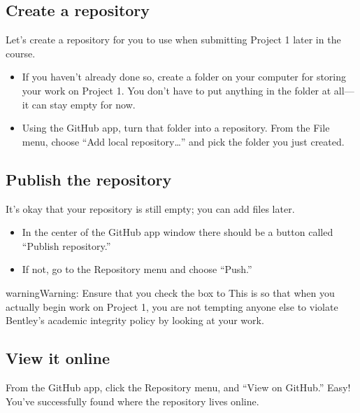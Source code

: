 \documentclass[letterpaper,10pt,english]{jupyterBook}
\begin{document}
\subsection{Create a repository}
\label{\detokenize{chapter-8-version-control:create-a-repository}}
\sphinxAtStartPar
Let’s create a repository for you to use when submitting Project 1 later in the course.
\begin{itemize}
\item {} 
\sphinxAtStartPar
If you haven’t already done so, create a folder on your computer for storing your work on Project 1.  You don’t have to put anything in the folder at all—it can stay empty for now.

\item {} 
\sphinxAtStartPar
Using the GitHub app, turn that folder into a repository.  From the File menu, choose “Add local repository…” and pick the folder you just created.

\end{itemize}


\subsection{Publish the repository}
\label{\detokenize{chapter-8-version-control:publish-the-repository}}
\sphinxAtStartPar
It’s okay that your repository is still empty; you can add files later.
\begin{itemize}
\item {} 
\sphinxAtStartPar
In the center of the GitHub app window there should be a button called “Publish repository.”

\item {} 
\sphinxAtStartPar
If not, go to the Repository menu and choose “Push.”

\end{itemize}

\begin{sphinxadmonition}{warning}{Warning:}
\sphinxAtStartPar
Ensure that you check the box to   This is so that when you actually begin work on Project 1, you are not tempting anyone else to violate Bentley’s academic integrity policy by looking at your work.
\end{sphinxadmonition}


\subsection{View it online}
\label{\detokenize{chapter-8-version-control:view-it-online}}
\sphinxAtStartPar
From the GitHub app, click the Repository menu, and “View on GitHub.”  Easy!  You’ve successfully found where the repository lives online.
\end{document}
